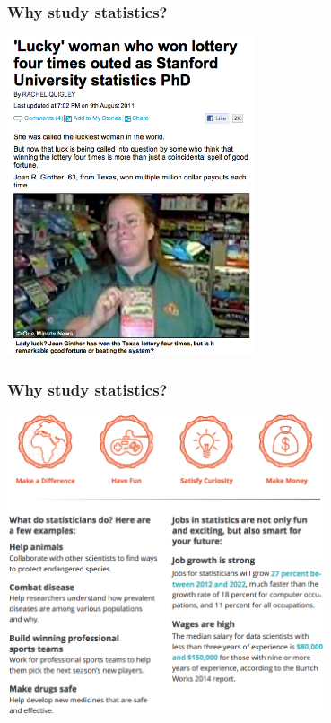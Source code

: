\documentclass[slidestop,compress,mathserif,12pt,t,professionalfonts,xcolor=table]{beamer}
\begin{document}
\begin{frame}
\frametitle{Why study statistics?}

\begin{center}
\includegraphics[width=0.55\textwidth]{figures/lottery}
\end{center}

\end{frame}


\begin{frame}
\frametitle{Why study statistics?}

\begin{center}
\includegraphics[width=0.7\textwidth]{figures/why_stats}
\end{center}

\vspace{-0.25cm}


\end{frame}
\end{document}
